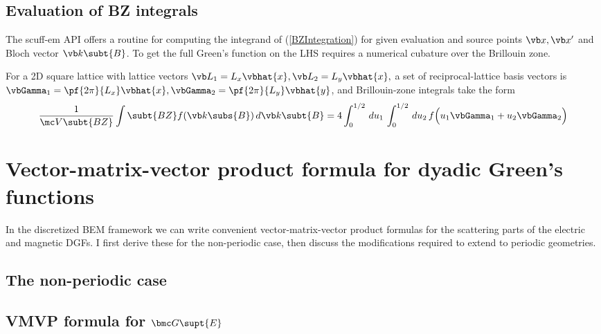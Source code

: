 \documentclass[letterpaper]{article}
\begin{document}
\subsection*{Evaluation of BZ integrals}

The {\sc scuff-em} API offers a routine for computing the integrand of
(\ref{BZIntegration}) for given evaluation and source points
$\vb x, \vb x^\prime$ and Bloch vector $\vb k\subt{B}$. To get the 
full Green's function on the LHS requires a numerical cubature
over the Brillouin zone.

For a 2D square lattice with lattice vectors 
$\vb L_1=L_x\vbhat{x}, \vb L_2=L_y\vbhat{x},$
a set of reciprocal-lattice basis vectors is 
$\vbGamma_1=\pf{2\pi}{L_x} \vbhat{x},
 \vbGamma_2=\pf{2\pi}{L_y} \vbhat{y}$,
and Brillouin-zone integrals take the form
$$ \frac{1}{\mc V\subt{BZ}} 
   \int\subt{BZ} f(\vb k\subs{B}) \, d \vb k\subt{B}
  =4\int_0^{1/2} \, d u_1 \, \int_0^{1/2} \, d u_2 \, 
   f\Big( u_1\vbGamma_1 + u_2\vbGamma_2 \Big)
$$

\newpage
\section{Vector-matrix-vector product formula for dyadic Green's functions}

In the discretized BEM framework we can write convenient
vector-matrix-vector product formulas for the scattering parts
of the electric and magnetic DGFs. I first derive these for
the non-periodic case, then discuss the modifications required
to extend to periodic geometries.

\subsection{The non-periodic case}

\subsection*{VMVP formula for $\bmc G\supt{E}$}
\end{document}
